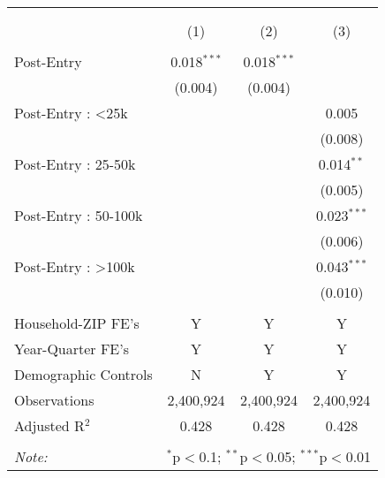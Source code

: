 
\begin{table}[!htbp] \centering 
  \caption{} 
  \label{} 
\begin{tabular}{@{\extracolsep{5pt}}lccc} 
\\[-1.8ex]\hline 
\hline \\[-1.8ex] 
\\[-1.8ex] & (1) & (2) & (3)\\ 
\hline \\[-1.8ex] 
 Post-Entry & 0.018$^{***}$ & 0.018$^{***}$ &  \\ 
  & (0.004) & (0.004) &  \\ 
  Post-Entry : <25k &  &  & 0.005 \\ 
  &  &  & (0.008) \\ 
  Post-Entry : 25-50k &  &  & 0.014$^{**}$ \\ 
  &  &  & (0.005) \\ 
  Post-Entry : 50-100k &  &  & 0.023$^{***}$ \\ 
  &  &  & (0.006) \\ 
  Post-Entry : >100k &  &  & 0.043$^{***}$ \\ 
  &  &  & (0.010) \\ 
 \hline \\[-1.8ex] 
Household-ZIP FE's & Y & Y & Y \\ 
Year-Quarter FE's & Y & Y & Y \\ 
Demographic Controls & N & Y & Y \\ 
Observations & 2,400,924 & 2,400,924 & 2,400,924 \\ 
Adjusted R$^{2}$ & 0.428 & 0.428 & 0.428 \\ 
\hline 
\hline \\[-1.8ex] 
\textit{Note:}  & \multicolumn{3}{l}{$^{*}$p$<$0.1; $^{**}$p$<$0.05; $^{***}$p$<$0.01} \\ 
\end{tabular} 
\end{table} 
